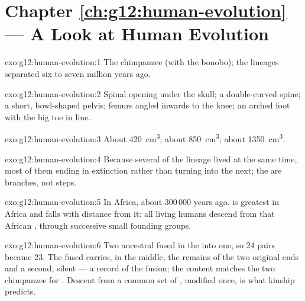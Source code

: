\section*{Chapter \ref{ch:g12:human-evolution} --- A Look at Human Evolution}

\begin{solution}{exo:g12:human-evolution:1}
The chimpanzee (with the bonobo); the lineages separated six to seven
million years ago.
\end{solution}

\begin{solution}{exo:g12:human-evolution:2}
Spinal opening under the skull; a double-curved spine; a short,
bowl-shaped pelvis; femurs angled inwards to the knee; an arched foot
with the big toe in line.
\end{solution}

\begin{solution}{exo:g12:human-evolution:3}
About \qty{420}{cm^3}; about \qty{850}{cm^3}; about \qty{1350}{cm^3}.
\end{solution}

\begin{solution}{exo:g12:human-evolution:4}
Because several  of the lineage lived at the same time, most
of them ending in extinction rather than turning into the next; the
 are branches, not steps.
\end{solution}

\begin{solution}{exo:g12:human-evolution:5}
In Africa, about 300\,000 years ago.  is greatest in
Africa and falls with distance from it: all living humans descend
from that African , through successive small founding
groups.
\end{solution}

\begin{solution}{exo:g12:human-evolution:6}
Two ancestral  fused in the  into one, so 24
pairs became 23. The fused  carries, in the middle, the
remains of the two original ends and a second, silent  ---
a record of the fusion; the  content matches the two chimpanzee
  for . Descent from a common set of ,
modified once, is what kinship predicts.
\end{solution}

